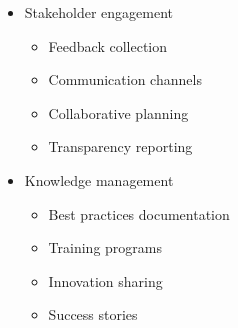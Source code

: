 \begin{itemize}
\begin{itemize}
        \item Stakeholder engagement
        \begin{itemize}
            \item Feedback collection
            \item Communication channels
            \item Collaborative planning
            \item Transparency reporting
        \end{itemize}
        
        \item Knowledge management
        \begin{itemize}
            \item Best practices documentation
            \item Training programs
            \item Innovation sharing
            \item Success stories
        \end{itemize}
    \end{itemize}
\end{itemize}
